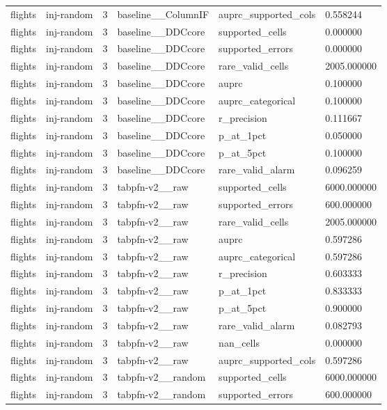 \begin{tabular}{llllll}
flights & inj-random & 3 & baseline\_\_ColumnIF & auprc\_supported\_cols & 0.558244 \\
flights & inj-random & 3 & baseline\_\_DDCcore & supported\_cells & 0.000000 \\
flights & inj-random & 3 & baseline\_\_DDCcore & supported\_errors & 0.000000 \\
flights & inj-random & 3 & baseline\_\_DDCcore & rare\_valid\_cells & 2005.000000 \\
flights & inj-random & 3 & baseline\_\_DDCcore & auprc & 0.100000 \\
flights & inj-random & 3 & baseline\_\_DDCcore & auprc\_categorical & 0.100000 \\
flights & inj-random & 3 & baseline\_\_DDCcore & r\_precision & 0.111667 \\
flights & inj-random & 3 & baseline\_\_DDCcore & p\_at\_1pct & 0.050000 \\
flights & inj-random & 3 & baseline\_\_DDCcore & p\_at\_5pct & 0.100000 \\
flights & inj-random & 3 & baseline\_\_DDCcore & rare\_valid\_alarm & 0.096259 \\
flights & inj-random & 3 & tabpfn-v2\_\_raw & supported\_cells & 6000.000000 \\
flights & inj-random & 3 & tabpfn-v2\_\_raw & supported\_errors & 600.000000 \\
flights & inj-random & 3 & tabpfn-v2\_\_raw & rare\_valid\_cells & 2005.000000 \\
flights & inj-random & 3 & tabpfn-v2\_\_raw & auprc & 0.597286 \\
flights & inj-random & 3 & tabpfn-v2\_\_raw & auprc\_categorical & 0.597286 \\
flights & inj-random & 3 & tabpfn-v2\_\_raw & r\_precision & 0.603333 \\
flights & inj-random & 3 & tabpfn-v2\_\_raw & p\_at\_1pct & 0.833333 \\
flights & inj-random & 3 & tabpfn-v2\_\_raw & p\_at\_5pct & 0.900000 \\
flights & inj-random & 3 & tabpfn-v2\_\_raw & rare\_valid\_alarm & 0.082793 \\
flights & inj-random & 3 & tabpfn-v2\_\_raw & nan\_cells & 0.000000 \\
flights & inj-random & 3 & tabpfn-v2\_\_raw & auprc\_supported\_cols & 0.597286 \\
flights & inj-random & 3 & tabpfn-v2\_\_random & supported\_cells & 6000.000000 \\
flights & inj-random & 3 & tabpfn-v2\_\_random & supported\_errors & 600.000000 \\

\end{tabular}
